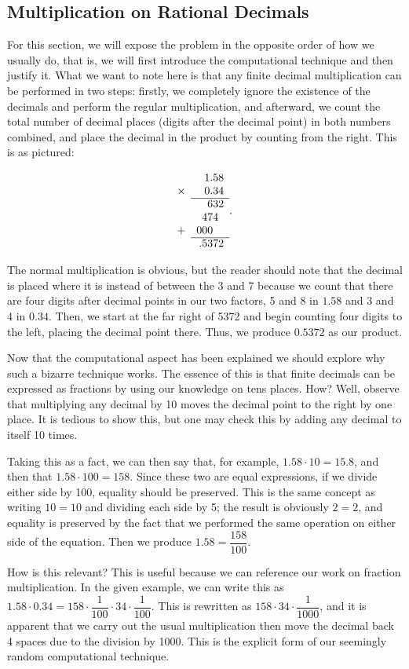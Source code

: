 \documentclass[openany]{book}
\begin{document}
\subsection{Multiplication on Rational Decimals}
For this section, we will expose the problem in the opposite order of how we usually do, that is, we will first introduce the computational technique and then justify it. What we want to note here is that any finite decimal multiplication can be performed in two steps: firstly, we completely ignore the existence of the decimals and perform the regular multiplication, and afterward, we count the total number of decimal places (digits after the decimal point) in both numbers combined, and place the decimal in the product by counting from the right. This is as pictured:\par
\[
	\begin{array}{@{}cr}
	&1.58\\
	\times&\;\:0.34\\
	\cline{2-2}
	& 632\\
	& 474\;\:\\
	+ & 000\;\:\;\:\\
	\cline{2-2}
	& .5372
	\end{array}.
\]\par
The normal multiplication is obvious, but the reader should note that the decimal is placed where it is instead of between the 3 and 7 because we count that there are four digits after decimal points in our two factors, 5 and 8 in $1.58$ and 3 and 4 in $0.34$. Then, we start at the far right of 5372 and begin counting four digits to the left, placing the decimal point there. Thus, we produce $0.5372$ as our product.\par
Now that the computational aspect has been explained we should explore why such a bizarre technique works. The essence of this is that finite decimals can be expressed as fractions by using our knowledge on tens places. How? Well, observe that multiplying any decimal by 10 moves the decimal point to the right by one place. It is tedious to show this, but one may check this by adding any decimal to itself 10 times.\par
Taking this as a fact, we can then say that, for example, $1.58\cdot10 = 15.8$, and then that $1.58\cdot100 = 158$. Since these two are equal expressions, if we divide either side by 100, equality should be preserved. This is the same concept as writing $10=10$ and dividing each side by 5; the result is obviously $2=2$, and equality is preserved by the fact that we performed the same operation on either side of the equation. Then we produce $1.58 = \dfrac{158}{100}$.\par
How is this relevant? This is useful because we can reference our work on fraction multiplication. In the given example, we can write this as $1.58\cdot0.34 = 158\cdot\dfrac{1}{100}\cdot34\cdot\dfrac{1}{100}$. This is rewritten as $158\cdot34\cdot\dfrac{1}{1000}$, and it is apparent that we carry out the usual multiplication then move the decimal back 4 spaces due to the division by 1000. This is the explicit form of our seemingly random computational technique.
\end{document}
